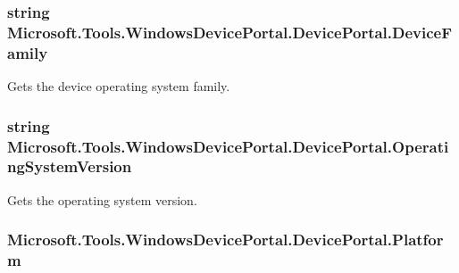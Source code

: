\subsubsection[{\texorpdfstring{Device\+Family}{DeviceFamily}}]{\setlength{\rightskip}{0pt plus 5cm}string Microsoft.\+Tools.\+Windows\+Device\+Portal.\+Device\+Portal.\+Device\+Family\hspace{0.3cm}{\ttfamily [get]}}\hypertarget{class_microsoft_1_1_tools_1_1_windows_device_portal_1_1_device_portal_ab0e688179889f2dc2c3585da28548001}{}\label{class_microsoft_1_1_tools_1_1_windows_device_portal_1_1_device_portal_ab0e688179889f2dc2c3585da28548001}


Gets the device operating system family. 

\subsubsection[{\texorpdfstring{Operating\+System\+Version}{OperatingSystemVersion}}]{\setlength{\rightskip}{0pt plus 5cm}string Microsoft.\+Tools.\+Windows\+Device\+Portal.\+Device\+Portal.\+Operating\+System\+Version\hspace{0.3cm}{\ttfamily [get]}}\hypertarget{class_microsoft_1_1_tools_1_1_windows_device_portal_1_1_device_portal_aa418a5e83647805a2f1a703da4ba78b6}{}\label{class_microsoft_1_1_tools_1_1_windows_device_portal_1_1_device_portal_aa418a5e83647805a2f1a703da4ba78b6}


Gets the operating system version. 

\subsubsection[{\texorpdfstring{Platform}{Platform}}]{ Microsoft.\+Tools.\+Windows\+Device\+Portal.\+Device\+Portal.\+Platform\hspace{0.3cm}{\ttfamily [get]}}\hypertarget{class_microsoft_1_1_tools_1_1_windows_device_portal_1_1_device_portal_a96041da10486986c32683e4fdf17b6b7}{}\label{class_microsoft_1_1_tools_1_1_windows_device_portal_1_1_device_portal_a96041da10486986c32683e4fdf17b6b7}


